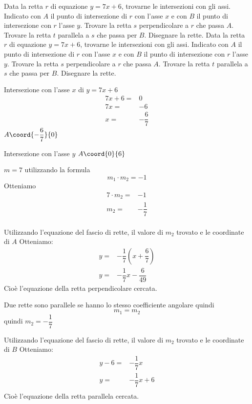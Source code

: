 \begin{exercise}
	Data la retta $r$ di equazione $y=7x+6$, trovarne le intersezioni con gli assi. Indicato con $A$ il punto di intersezione di $r$ con l'asse $x$ e con $B$ il punto di intersezione con $r$ l'asse $y$. Trovare la retta $s$ perpendicolare a $r$ che passa $A$.
	Trovare la retta $t$ parallela a $s$ che passa per $B$. Disegnare la rette.
	\tcblower
	Data la retta $r$ di equazione $y=7x+6$, trovarne le intersezioni con gli assi. Indicato con $A$ il punto di intersezione di $r$ con l'asse $x$ e con $B$ il punto di intersezione con $r$ l'asse $y$. Trovare la retta $s$ perpendicolare a $r$ che passa $A$.
	Trovare la retta $t$ parallela a $s$ che passa per $B$. Disegnare la rette.
	
	Intersezione con l'asse $x$ di $y=7x+6$
	\begin{align*}
		7x+6=&0\\
		7x=&-6\\
		x=&-\dfrac{6}{7}
	\end{align*}
	$A\coord{-\dfrac{6}{7}}{0}$
	
	Intersezione con l'asse $y$
	$A\coord{0}{6}$
	
	$m=7$ utilizzando la formula \[m_1\cdot m_2=-1\] Otteniamo
	\begin{align*}
		7\cdot m_2=&-1\\
		m_2=&-\dfrac{1}{7}\\
	\end{align*}
	
	Utilizzando l'equazione del fascio di rette, il valore di $m_2$ trovato e le coordinate di $A$ Otteniamo:
	\begin{align*}
		y=&-\dfrac{1}{7}(x+\dfrac{6}{7})\\
		y=&-\dfrac{1}{7}x-\dfrac{6}{49}
	\end{align*}
	Cioè l'equazione della retta perpendicolare cercata.
	
	Due rette sono parallele se hanno lo stesso coefficiente angolare quindi \[m_1=m_2 \]
	quindi $m_2=-\dfrac{1}{7}$ 
	
	Utilizzando l'equazione del fascio di rette, il valore di $m_2$ trovato e le coordinate di $B$ Otteniamo:
	\begin{align*}
		y-6=&-\dfrac{1}{7}x\\
		y=&-\dfrac{1}{7}x+6\\
	\end{align*}
	Cioè l'equazione della retta parallela cercata.	
	\begin{center}
		
	\end{center} 	
\end{exercise}
